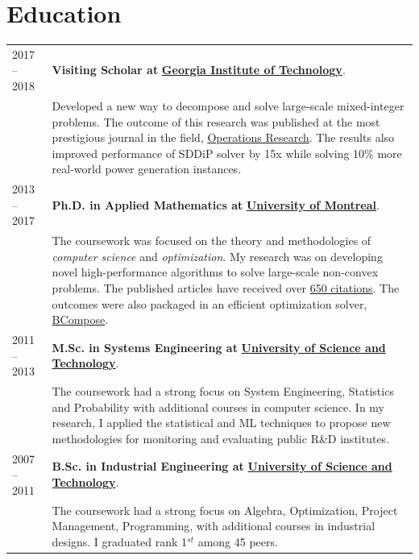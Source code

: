 \documentclass[10PT,letter]{article}
\newcommand{\numbox}[1]{} %
\begin{document}
            
\section*{\numbox{1}\bfseries\textcolor{titlecol}{\sffamily Education}}
	\begin{tabular}{p{1.2in}p{5.5in}}
			\textsc{2017 -- 2018} & \textbf{Visiting Scholar at} \href{https://www.isye.gatech.edu}{\textbf{Georgia Institute of Technology}}.
			\\[.5mm]
			&  Developed  a new way to decompose and solve large-scale mixed-integer problems. The outcome of this research was published at the most prestigious journal in the field,  \href{https://pubsonline.informs.org/doi/pdf/10.1287/opre.2019.1892}{Operations Research}. The results also improved performance of SDDiP solver by 15x while solving 10\% more real-world power generation instances.\\[.5mm] 
			\textsc{2013 -- 2017} & \textbf{{Ph.D. in Applied Mathematics} at} \href{https://www.polymtl.ca/magi/}{\textbf{University of Montreal}}.\\[.5mm]
			& The coursework was   focused on the  theory and methodologies of \textit{computer science} and \textit{optimization}. My research was  on developing novel high-performance algorithms to solve large-scale non-convex problems. The  published articles have received over \href{https://scholar.google.com/citations?hl=en&user=3V2o0Q0AAAAJ&view_op=list_works&sortby=pubdate}{650 citations}. The outcomes were also packaged in an efficient optimization solver,  \href{https://github.com/Ragheb2464/BCompose}{BCompose}.\\[.5mm] 
			\textsc{2011 -- 2013} &\textbf{ {M.Sc. in Systems Engineering} at} \href{http://www.iust.ac.ir/en}{\textbf{University of Science and Technology}}.\\[.5mm]
			& The coursework had a strong focus on System Engineering, Statistics and Probability  with additional courses in  computer science. In my research, I applied the statistical and ML techniques  to propose new methodologies for monitoring and evaluating  public R\&D institutes.\\[.5mm] 
			\textsc{2007 -- 2011} & \textbf{{B.Sc. in Industrial Engineering} at} \href{http://www.iust.ac.ir/en}{\textbf{University of Science and Technology}}.\\[.5mm]
			& The coursework had a strong focus on Algebra, Optimization, Project Management, Programming,  with additional courses in industrial designs. I graduated rank 1$^{st}$  among 45 peers. 
	\end{tabular}
\end{document}
